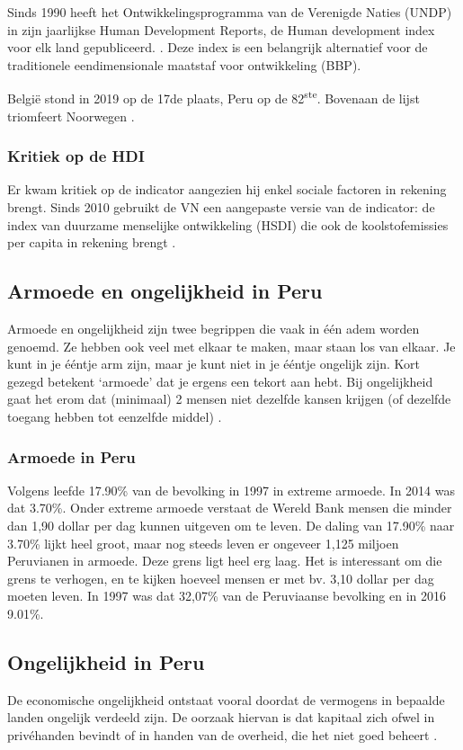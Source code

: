 Sinds 1990 heeft het Ontwikkelingsprogramma van de Verenigde Naties (UNDP) in zijn jaarlijkse Human Development Reports, de Human development index voor elk land gepubliceerd. \autocite{AmbujD.Sagar1997}. Deze index is een belangrijk alternatief voor de traditionele eendimensionale maatstaf voor ontwikkeling (BBP). 

België stond in 2019 op de 17de plaats, Peru op de 82\textsuperscript{ste}. Bovenaan de lijst triomfeert Noorwegen \autocite{UNDP2019a}.

\subsubsection{Kritiek op de HDI}
Er kwam kritiek op de indicator aangezien hij enkel sociale factoren in rekening brengt. Sinds 2010 gebruikt de VN een aangepaste versie van de indicator: de index van duurzame menselijke ontwikkeling (HSDI) die ook de koolstofemissies per capita in rekening brengt \autocite{Economie2018}.

\subsection{Armoede en ongelijkheid in Peru}
Armoede en ongelijkheid zijn twee begrippen die vaak in één adem worden genoemd. Ze hebben ook veel met elkaar te maken, maar staan los van elkaar. Je kunt in je ééntje arm zijn, maar je kunt niet in je ééntje ongelijk zijn. Kort gezegd betekent ‘armoede’ dat je ergens een tekort aan hebt. Bij ongelijkheid gaat het erom dat (minimaal) 2 mensen niet dezelfde kansen krijgen (of dezelfde toegang hebben tot eenzelfde middel) \autocite{Novib2020}.

\subsubsection{Armoede in Peru}
Volgens \autocite{OurWorldInData2016} leefde 17.90\% van de bevolking in 1997 in extreme armoede. In 2014 was dat 3.70\%. Onder extreme armoede verstaat de Wereld Bank mensen die minder dan 1,90 dollar per dag kunnen uitgeven om te leven. De daling van 17.90\% naar 3.70\% lijkt heel groot, maar nog steeds leven er ongeveer 1,125 miljoen Peruvianen in armoede. Deze grens ligt heel erg laag. Het is interessant om die grens te verhogen, en te kijken hoeveel mensen er met bv. 3,10 dollar per dag moeten leven. In 1997 was dat 32,07\% van de Peruviaanse bevolking en in 2016  9.01\%.

\subsection{Ongelijkheid in Peru}
De economische ongelijkheid ontstaat vooral doordat de vermogens in bepaalde landen ongelijk verdeeld zijn. De oorzaak hiervan is dat kapitaal zich ofwel in privéhanden bevindt of in handen van de overheid, die het niet goed beheert \autocite{Zucman2018}.

